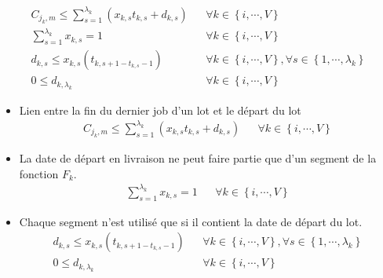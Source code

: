\begin{align}
	C_{j_k, m} \leq \sum_{s=1}^{\lambda_k} \left( x_{k,s} t_{k, s} + d_{k, s} \right) &  & \forall k \in \left\{i, \cdots, V \right\}                                                    \\
	\sum_{s=1}^{\lambda_k} x_{k, s} = 1                                               &  & \forall k \in \left\{i, \cdots, V \right\}                                                    \\
	d_{k, s} \leq x_{k, s} \left( t_{k, s+1 - t_{k, s} -1} \right)                    &  & \forall k \in \left\{i, \cdots, V \right\}, \forall s \in \left\{1, \cdots, \lambda_k\right\} \\
	0 \leq d_{k, \lambda_k}                                                           &  & \forall k \in \left\{i, \cdots, V \right\}
\end{align}
\begin{itemize}
	\item
	      Lien entre la fin du dernier job d'un lot et le départ du lot
	      \begin{align}
		      C_{j_k, m} \leq \sum_{s=1}^{\lambda_k} \left( x_{k,s} t_{k, s} + d_{k, s} \right) &  & \forall k \in \left\{i, \cdots, V \right\}
	      \end{align}
	\item
	      La date de départ en livraison ne peut faire partie que d'un segment de la fonction $F_k$.
	      \begin{align}
		      \sum_{s=1}^{\lambda_k} x_{k, s} = 1 &  & \forall k \in \left\{i, \cdots, V \right\}
	      \end{align}
	\item
	      Chaque segment n'est utilisé que si il contient la date de départ du lot.
	      \begin{align}
		      d_{k, s} \leq x_{k, s} \left( t_{k, s+1 - t_{k, s} -1} \right) &  & \forall k \in \left\{i, \cdots, V \right\}, \forall s \in \left\{1, \cdots, \lambda_k\right\} \\
		      0 \leq d_{k, \lambda_k}                                        &  & \forall k \in \left\{i, \cdots, V \right\}
	      \end{align}
\end{itemize}

